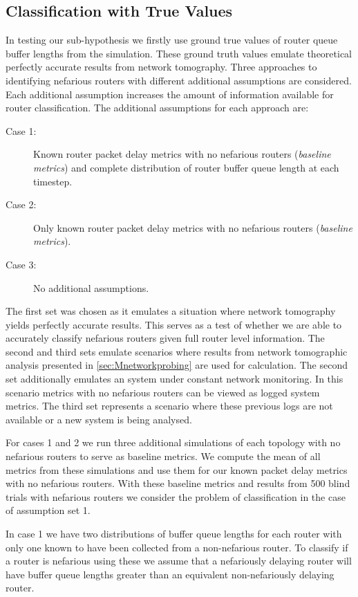   \subsection{Classification with True Values}
  \label{ssec:MTruevalues}
  In testing our sub-hypothesis we firstly use ground true values of router queue buffer lengths from the simulation. These ground truth values emulate theoretical perfectly accurate results from network tomography. Three approaches to identifying nefarious routers with different additional assumptions are considered. Each additional assumption increases the amount of information available for router classification. The additional assumptions for each approach are:
  \begin{description}
      \item[Case 1:] Known router packet delay metrics with no nefarious routers (\textit{baseline metrics}) and complete distribution of router buffer queue length at each timestep.
      \item[Case 2:] Only known router packet delay metrics with no nefarious routers (\textit{baseline metrics}).
      \item[Case 3:] No additional assumptions.
  \end{description}
  The first set was chosen as it emulates a situation where network tomography yields perfectly accurate results. This serves as a test of whether we are able to accurately classify nefarious routers given full router level information. The second and third sets emulate scenarios where results from network tomographic analysis presented in \cref{sec:Mnetworkprobing} are used for calculation. The second set additionally emulates an system under constant network monitoring. In this scenario metrics with no nefarious routers can be viewed as logged system metrics. The third set represents a scenario where these previous logs are not available or a new system is being analysed.\par
  For cases 1 and 2 we run three additional simulations of each topology with no nefarious routers to serve as baseline metrics. We compute the mean of all metrics from these simulations and use them for our known packet delay metrics with no nefarious routers. With these baseline metrics and results from 500 blind trials with nefarious routers we consider the problem of classification in the case of assumption set 1.\par
  In case 1 we have two distributions of buffer queue lengths for each router with only one known to have been collected from a non-nefarious router. To classify if a router is nefarious using these we assume that a nefariously delaying router will have buffer queue lengths greater than an equivalent non-nefariously delaying router.\par
